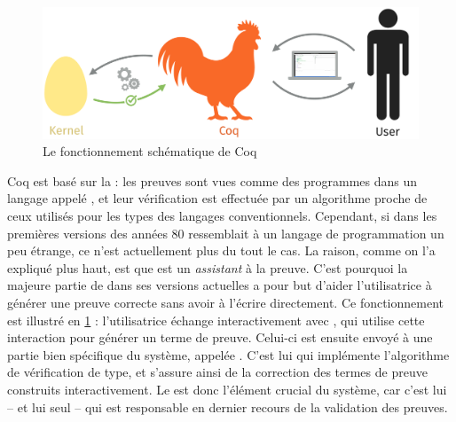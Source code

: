 \begin{figure}[h]

  \centering
  \includegraphics{./figures/coq-kernel-fr.pdf}

  \caption{Le fonctionnement schématique de Coq}
  \label{fig-coq}
\end{figure}

Coq est basé sur la  : les preuves sont vues comme des programmes dans un langage appelé ,
et leur vérification est effectuée par un algorithme proche
de ceux utilisés pour les types des langages conventionnels.
Cependant, si dans les premières versions des années 80  ressemblait à un langage de programmation un peu étrange, ce n’est actuellement plus du tout le cas.
La raison, comme on l’a expliqué plus haut, est que  est un \emph{assistant} à la preuve.
C’est pourquoi la majeure partie de  dans ses versions actuelles a pour but d’aider l’utilisatrice à générer une preuve correcte sans avoir à l’écrire directement.
Ce fonctionnement est illustré en \cref{fig-coq} : l’utilisatrice échange interactivement avec , qui utilise cette interaction pour générer un terme de preuve. Celui-ci est ensuite envoyé à une partie bien spécifique du système, appelée .
C’est lui qui implémente l’algorithme de vérification de type, et s’assure ainsi de la correction des termes de preuve construits interactivement.
Le  est donc l’élément crucial du système, car c’est lui – et lui seul – qui est responsable en dernier recours de la validation des preuves.


